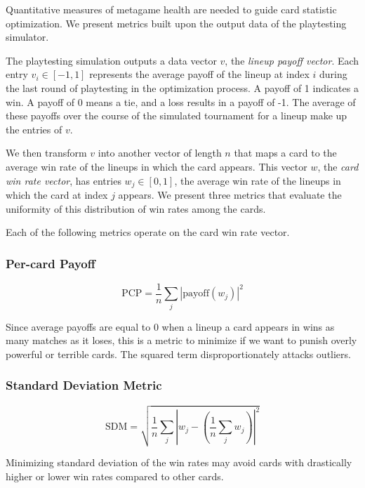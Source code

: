 \documentclass[letterpaper]{article} %
\begin{document}
Quantitative measures of metagame health are needed to guide 
card statistic optimization. We present metrics built upon the
output data of the playtesting simulator.

The playtesting simulation outputs a data vector $v$, the \emph{lineup payoff vector}.
Each entry $v_i \in [-1, 1]$ represents the average payoff of
the lineup at index $i$ during the last round of playtesting in
the optimization process. A payoff of 1 indicates a win. A
payoff of 0 means a tie, and a loss results in a payoff of -1.
The average of these payoffs over the course of the simulated
tournament for a lineup make up the entries of $v$.

We then transform $v$ into another vector of length $n$ that maps a card to the
average win rate of the lineups in which the card appears. This
vector $w$, the \emph{card win rate vector}, has entries
$w_j \in [0, 1]$, the average win rate of the lineups in which
the card at index $j$ appears. We present three metrics that 
evaluate the uniformity of 
this distribution of win rates among the cards.

Each of the following metrics operate on the card win rate vector.

\subsubsection{Per-card Payoff}

\begin{equation}
	\mathrm{PCP} = \frac{1}{n} \sum_j \left|\mathrm{payoff}(w_j)\right|^2
\end{equation}

Since average payoffs are equal to 0 when a lineup a card appears in wins as many matches as it loses, this is a metric to 
minimize if we want to punish overly powerful or terrible cards. The squared term disproportionately attacks outliers.

\subsubsection{Standard Deviation Metric}

\begin{equation}
	\mathrm{SDM} = \sqrt{\frac{1}{n} \sum_j \left|w_j - \left(\frac{1}{n}\sum_j w_j\right)\right|^2}
\end{equation}

Minimizing standard deviation of the win rates may avoid cards with
drastically higher or lower win rates compared to other cards.
\end{document}
